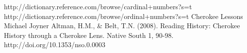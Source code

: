 

\begin{thebibliography}{99}
 http://dictionary.reference.com/browse/cardinal+numbers?s=t
 http://dictionary.reference.com/browse/ordinal+numbers?s=t
 Cherokee Lessons Michael Joyner
 Altman, H.M., \& Belt, T.N. (2008). Reading History: Cherokee History through a Cherokee Lens. Native South 1, 90-98. http://doi.org/10.1353/nso.0.0003
\end{thebibliography}
